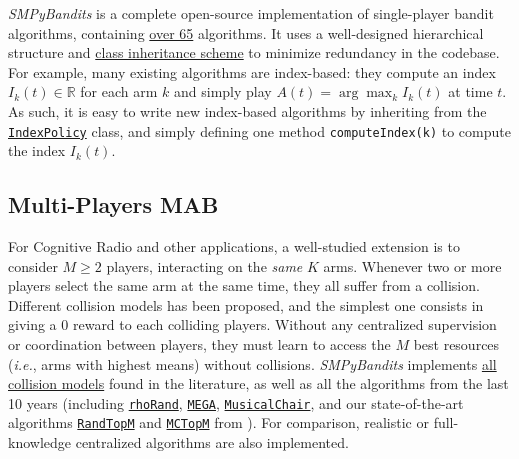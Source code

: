 \documentclass[a4paper,10pt,]{article}
\begin{document}
\emph{SMPyBandits} is a complete open-source implementation of
single-player bandit algorithms,
containing \href{https://SMPyBandits.GitHub.io/docs/Policies.html}{over 65} algorithms.
It uses a well-designed hierarchical structure and
\href{https://SMPyBandits.GitHub.io/uml_diagrams/README.html}{class
inheritance scheme} to minimize redundancy in the codebase.
For example, many existing algorithms are index-based:
they compute an index $I_k(t)\in\mathbb{R}$ for each arm $k$ and simply play $A(t) = \arg\max_k I_k(t)$ at time $t$.
As such, it is easy to write new index-based algorithms by inheriting from the
\href{https://SMPyBandits.GitHub.io/docs/Policies.IndexPolicy.html}{\texttt{IndexPolicy}}
class, and simply defining one method \texttt{computeIndex(k)} to compute the index $I_k(t)$.


\subsection{Multi-Players MAB}\label{multi-players-mab}

For Cognitive Radio and other applications, a well-studied extension is to
consider \(M\geq2\) players, interacting on the \emph{same} \(K\) arms.
Whenever two or more players select the same arm at the same time, they
all suffer from a collision. Different collision models has been
proposed, and the simplest one consists in giving a \(0\) reward to each
colliding players. Without any centralized supervision or coordination
between players, they must learn to access the \(M\) best resources
(\emph{i.e.}, arms with highest means) without collisions.
\emph{SMPyBandits} implements
\href{https://SMPyBandits.GitHub.io/docs/Environment.CollisionModels.html}{all
collision models} found in the literature, as well as all the
algorithms from the last 10 years (including
\href{https://SMPyBandits.GitHub.io/docs/PoliciesMultiPlayers.rhoRand.html}{\texttt{rhoRand}},
\href{https://SMPyBandits.GitHub.io/docs/Policies.MEGA.html}{\texttt{MEGA}},
\href{https://SMPyBandits.GitHub.io/docs/Policies.MusicalChair.html}{\texttt{MusicalChair}}, and our state-of-the-art algorithms
\href{https://SMPyBandits.GitHub.io/docs/PoliciesMultiPlayers.RandTopM.html}{\texttt{RandTopM}}
and
\href{https://SMPyBandits.GitHub.io/docs/PoliciesMultiPlayers.MCTopM.html}{\texttt{MCTopM}}
from \citet{BessonALT2018}).
For comparison, realistic or full-knowledge centralized algorithms are also implemented.

\end{document}
